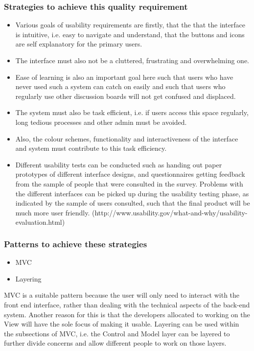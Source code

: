 \documentclass[a4paper,12pt]{article}
\begin{document}
 \subsubsection{Strategies to achieve this quality requirement}
 \begin{itemize}
 \item Various goals of usability requirements are firstly, that the that the interface is intuitive, i.e. easy to navigate and understand, that the buttons and icons are self explanatory for the primary users.
 \item The interface must also not be a cluttered, frustrating and overwhelming one. 
 \item Ease of learning is also an important goal here such that users who have never used such a system can catch on easily and such that users who regularly use other discussion boards will not get confused and displaced. 
 \item The system must also be task efficient, i.e. if users access this space regularly, long tedious processes and other admin must be avoided.
\item Also, the colour schemes, functionality and interactiveness of the interface and system must contribute to this task efficiency. 
\item Different usability tests can be conducted such as handing out paper prototypes of different interface designs, and questionnaires getting feedback from the sample of people that were consulted in the survey. Problems with the different interfaces can be picked up during the usability testing phase, as indicated by the sample of users consulted, such that the final product will be much more user friendly. (http://www.usability.gov/what-and-why/usability-evaluation.html)
 \end{itemize}
 \subsubsection{Patterns to achieve these strategies}
 \begin{itemize}
 \item MVC
 \item Layering
\end{itemize}
MVC is a suitable pattern because the user will only need to interact with the front end interface, rather than dealing with the technical aspects of the back-end system. Another reason for this is that the developers allocated to working on the View will have the sole focus of making it usable.
Layering can be used within the subsections of MVC, i.e. the Control and Model layer can be layered to further divide concerns and allow different people to work on those layers.
\end{document}
